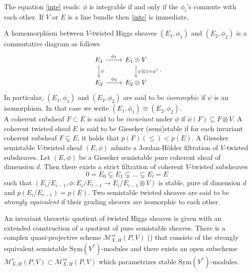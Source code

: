 \documentclass[12pt]{amsart}
\theoremstyle{definition}
\theoremstyle{remark}
\numberwithin{equation}{section}
\begin{document}
The equation \ref{inte} reads: $\phi$ is integrable if and only if the $\phi_i$'s commute with each other. If $V$ or $E$ is a line bundle then \ref{inte} is immediate. 

A homomorphism between $V$-twisted Higgs sheaves $(E_1, \phi_1)$ and $(E_2, \phi_2)$ is a commutative diagram as follows
\begin{equation}
\begin{tikzcd}
E_1 \arrow[r, "\phi_1"] \arrow[d, "\psi"]
& E_1\otimes V \arrow[d, "\psi \otimes 1 = \psi' "] \\
E_2 \arrow[r, "\phi_2 "]
& E_2\otimes V
\end{tikzcd}.
\end{equation}
In particular, $(E_1, \phi_1)$ and $(E_2, \phi_2)$ are said to be \textit{isomorphic} if $\psi$ is an isomorphism. In that case we write $(E_1, \phi_1)\cong (E_2, \phi_2)$.\\

A coherent subsheaf $F\subset E$ is said to be \textit{invariant} under $\phi$ if $\phi(F)\subseteq F\otimes V$. A coherent twisted sheaf $E$ is said to be Gieseker (semi)stable if for each invariant coherent subsheaf $F\subsetneq E$, it holds that $p(F) (\leq) < p(E)$. A Gieseker semistable $V$-twisted sheaf $(E, \phi)$ admits a Jordan-H\"older filtration of $V$-twisted subsheaves. Let $(E, \phi)$ be a Gieseker semistable pure coherent sheaf of dimension $d$. Then there exists a strict filtration of coherent $V$-twisted subsheaves 
\begin{equation}
0 = E_0\subsetneq E_1\subsetneq\dots\subsetneq E_l = E 
\end{equation}
such that $(E_i/E_{i-1}, \phi: E_i/E_{i-1}\to E_i/E_{i-1}\otimes V)$ is stable, pure of dimension $d$ and $p(E_i/E_{i-1}) = p(E)$. Two semistable twisted sheaves are said to be \textit{strongly equivalent} if their grading sheaves are isomorphic to each other. 

An invariant theoretic quotient of twisted Higgs sheaves is given with an extended construction of a quotient of pure semistable sheaves. There is a complex quasi-projective scheme $\mathcal{M}_{X, H}^{ss} (P, V)$ (\cite{Simp1}) that consists of the strongly equivalent semistable $\mbox{Sym}(V^*)$-modules and there exists an open subscheme $\mathcal{M}_{X, H}^{s}(P, V)\subset\mathcal{M}_{X, H}^{ss}(P, V)$ which parametrizes stable $\mbox{Sym}(V^*)$-modules.\\
\end{document}
